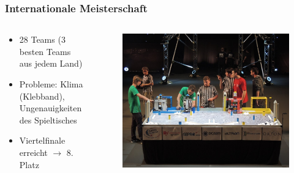 \begin{frame}
	\frametitle{Internationale Meisterschaft}
	
	\vspace{-2em}
	
	\begin{columns}[t]
		\begin{column}{0.5\textwidth}
			\begin{center}
				\begin{itemize}
					\item 28 Teams (3 besten Teams aus jedem Land)
					\item Probleme: Klima (Klebband), Ungenauigkeiten des Spieltisches
					\item Viertelfinale erreicht $\rightarrow$ 8. Platz
				\end{itemize}
			\end{center}
		\end{column}
		\begin{column}{0.5\textwidth}
			\begin{figure}
				\includegraphics[width=0.9\columnwidth]{../images/presentation/international.jpg}
			\end{figure}
		\end{column}
	\end{columns}
	
\end{frame}